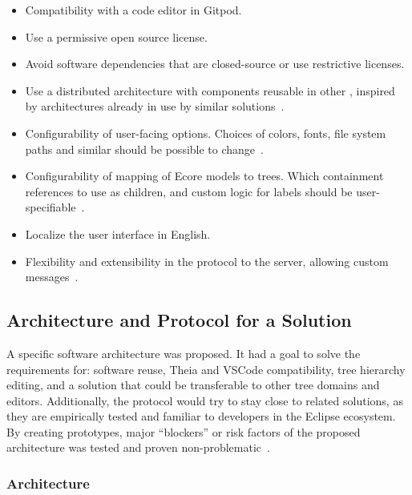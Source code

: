 \begin{itemize}
  \item Compatibility with a code editor in \gls{Gitpod}.
  \item Use a permissive \gls{open source} license.
  \item Avoid software dependencies that are closed-source or use restrictive licenses.
  \item Use a distributed architecture with components reusable in other , inspired by architectures already in use by similar solutions~\cite[p.~24]{rekstadModelingEnvironmentCloud2020}.
  \item Configurability of user-facing options. Choices of colors, fonts, file system paths and similar should be possible to change~\cite[p.~24]{rekstadModelingEnvironmentCloud2020}.
  \item Configurability of mapping of \gls{Ecore} models to trees. Which containment references to use as children, and custom logic for labels should be user-specifiable~\cite[p.~24]{rekstadModelingEnvironmentCloud2020}.
  \item Localize the user interface in English.
  \item Flexibility and extensibility in the protocol to the server, allowing custom messages~\cite[p.~24]{rekstadModelingEnvironmentCloud2020}.
\end{itemize}


\subsection{Architecture and Protocol for a Solution}\label{subsec:pre-project-protocol}

A specific software architecture was proposed.
It had a goal to solve the requirements for: software reuse, \gls{Theia} and \gls{VSCode} compatibility, tree hierarchy editing, and a solution that could be transferable to other tree domains and editors.
Additionally, the protocol would try to stay close to related solutions, as they are empirically tested and familiar to developers in the Eclipse ecosystem.
By creating prototypes, major ``blockers'' or risk factors of the proposed architecture was tested and proven non-problematic~\cite[p.~38-46]{rekstadModelingEnvironmentCloud2020}.


\subsubsection{Architecture}


